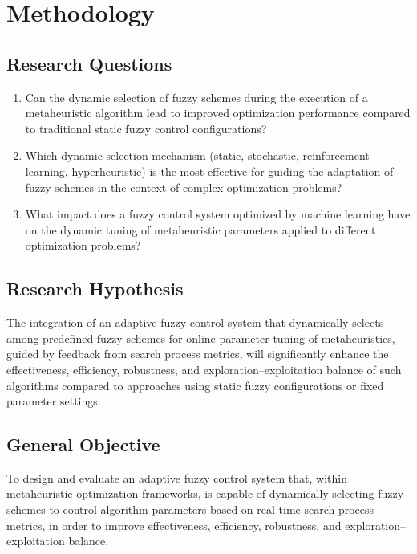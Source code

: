 \chapter{Methodology} \label{chapter:marco_metodologico}

\section{Research Questions}
\begin{enumerate}
    \item Can the dynamic selection of fuzzy schemes during the execution of a metaheuristic algorithm lead to improved optimization performance compared to traditional static fuzzy control configurations?
    \item Which dynamic selection mechanism (static, stochastic, reinforcement learning, hyperheuristic) is the most effective for guiding the adaptation of fuzzy schemes in the context of complex optimization problems?
    \item What impact does a fuzzy control system optimized by machine learning have on the dynamic tuning of metaheuristic parameters applied to different optimization problems?
\end{enumerate}

\section{Research Hypothesis}
The integration of an adaptive fuzzy control system that dynamically selects among predefined fuzzy schemes for online parameter tuning of metaheuristics, guided by feedback from search process metrics, will significantly enhance the effectiveness, efficiency, robustness, and exploration–exploitation balance of such algorithms compared to approaches using static fuzzy configurations or fixed parameter settings.

\section{General Objective}
To design and evaluate an adaptive fuzzy control system that, within metaheuristic optimization frameworks, is capable of dynamically selecting fuzzy schemes to control algorithm parameters based on real-time search process metrics, in order to improve effectiveness, efficiency, robustness, and exploration–exploitation balance. 


